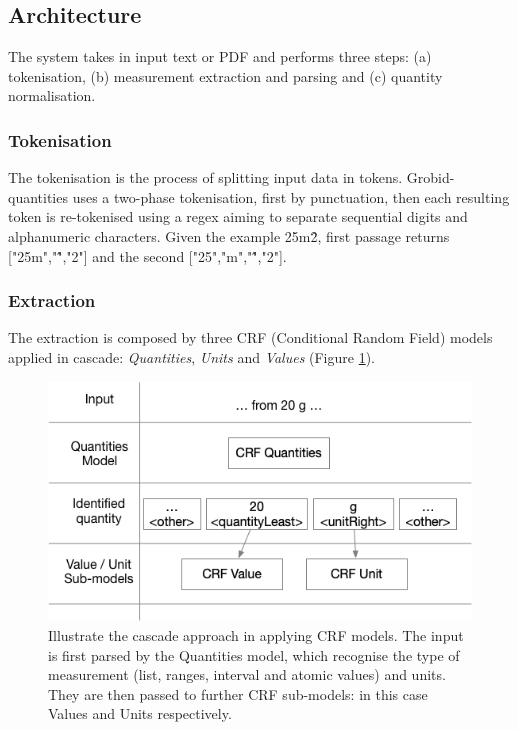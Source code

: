 \documentclass[sigconf]{acmart}
\begin{document}
\subsection{Architecture}
The system takes in input text or PDF and performs three steps: (a) tokenisation, (b) measurement extraction and parsing and (c) quantity normalisation. 

\subsubsection{Tokenisation}
The tokenisation is the process of splitting input data in tokens. Grobid-quantities uses a two-phase tokenisation, first by punctuation, then each resulting token is re-tokenised using a regex aiming to separate sequential digits and alphanumeric characters. Given the example 25m\^2, first passage returns ["25m","\^","2"] and the second ["25","m","\^","2"]. 

\subsubsection{Extraction}
The extraction is composed by three CRF (Conditional Random Field) models applied in cascade: \textit{Quantities}, \textit{Units} and \textit{Values} (Figure \ref{fig:schema-cascade}). 

\begin{figure}[ht]
  \centering
  \includegraphics[width=\linewidth]{images/schema-cascade}
  \caption{Illustrate the cascade approach in applying CRF models. The input is first parsed by the Quantities model, which recognise the type of measurement (list, ranges, interval and atomic values) and units. They are then passed to further CRF sub-models: in this case Values and Units respectively.}
  \label{fig:schema-cascade}
\end{figure}
\end{document}
